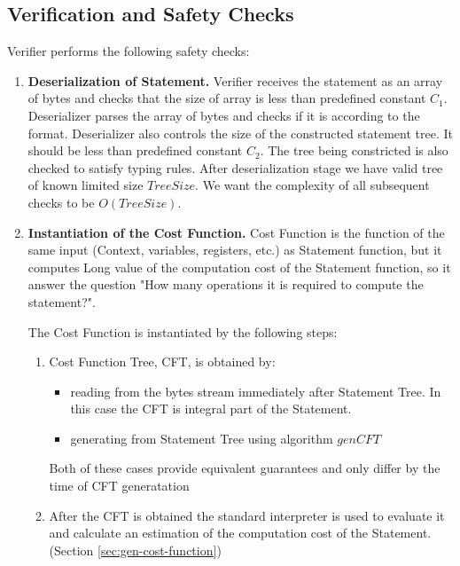 \documentclass[11pt]{article}
\begin{document}
\subsection{Verification and Safety Checks}
\label{sec:safety-checks}

Verifier performs the following safety checks:

\begin{enumerate}
\item \textbf{Deserialization of Statement.}
Verifier receives the statement as an array of bytes and checks that the size
of array is less than predefined constant $C_1$. Deserializer parses the
array of bytes and checks if it is according to the format. Deserializer also
controls the size of the constructed statement tree. It should be less than
predefined constant $C_2$. The tree being constricted is also checked to
satisfy typing rules. After deserialization stage we have valid tree of known
limited size $TreeSize$. We want the complexity of all subsequent checks to
be $O(TreeSize)$.

\item \textbf{Instantiation of the Cost Function.}
Cost Function is the function of the same input (Context, variables,
registers, etc.) as Statement function, but it computes Long value of the
computation cost of the Statement function, so it answer the question "How
many operations it is required to compute the statement?". 

The Cost Function is instantiated by the following steps:
    \begin{enumerate}
        \item Cost Function Tree, CFT, is obtained by:
        \begin{itemize}
            \item reading from the bytes stream immediately after Statement
            Tree. In this case the CFT is integral part of the Statement.
            \item generating from Statement Tree using algorithm $genCFT$
        \end{itemize}
        Both of these cases provide equivalent guarantees and only differ by
        the time of CFT generatation
        \item After the CFT is obtained the standard interpreter is used to
        evaluate it and calculate an estimation of the computation cost of
        the Statement. (Section \ref{sec:gen-cost-function})
    \end{enumerate}


\end{enumerate}
\end{document}
